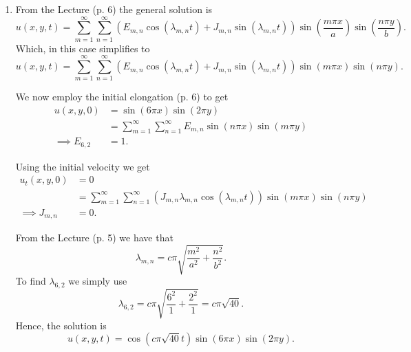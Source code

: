 \begin{derivation}
  \begin{enumerate}[label=\alph*)]
    \item From the Lecture (p. 6) the general solution is
      \begin{equation*}
        u(x,y,t) = \sum_{m = 1}^{\infty} \sum_{n = 1}^{\infty} \left( E_{m,n} \cos \left( \lambda_{m,n}t \right) + J_{m,n} \sin \left( \lambda_{m,n}t \right) \right) \sin \left( \frac{m \pi x}{a} \right) \sin \left( \frac{n \pi y}{b} \right)
      .\end{equation*}
      Which, in this case simplifies to
      \begin{equation*}
        u(x,y,t) = \sum_{m = 1}^{\infty} \sum_{n = 1}^{\infty} \left( E_{m,n} \cos \left( \lambda_{m,n}t \right) + J_{m,n} \sin \left( \lambda_{m,n}t \right) \right) \sin \left( m \pi x \right) \sin \left( n \pi y \right)
      .\end{equation*}

      We now employ the initial elongation (p. 6) to get
      \begin{align*}
        u(x,y,0) &= \sin (6 \pi x) \sin (2 \pi y) \\
        &= \sum_{m = 1}^{\infty} \sum_{n = 1}^{\infty} E_{m,n} \sin (n \pi x) \sin (m \pi y)\\
        \implies E_{6,2} &= 1
      .\end{align*}

      Using the initial velocity we get
      \begin{align*}
        u_t(x,y,0) &= 0 \\
        &=  \sum_{m = 1}^{\infty} \sum_{n = 1}^{\infty} \left( J_{m,n} \lambda_{m,n} \cos \left( \lambda_{m,n}t \right) \right) \sin \left( m \pi x \right) \sin \left( n \pi y \right) \\
        \implies J_{m,n} &= 0
      .\end{align*}
      
      From the Lecture (p. 5) we have that
      \begin{equation*}
        \lambda_{m,n} = c\pi \sqrt{\frac{m^2}{a^2} + \frac{n^2}{b^2}}
      .\end{equation*}
      To find $\lambda_{6,2}$ we simply use
      \begin{equation*}
        \lambda_{6,2} = c \pi \sqrt{\frac{6^2}{1} + \frac{2^2}{1}} = c\pi \sqrt{40}
      .\end{equation*}
      Hence, the solution is
      \begin{equation*}
        u(x,y,t) =\cos \left( c \pi \sqrt{40}t \right) \sin (6 \pi x) \sin (2 \pi y)
      .\end{equation*}


\end{enumerate}
\end{derivation}

